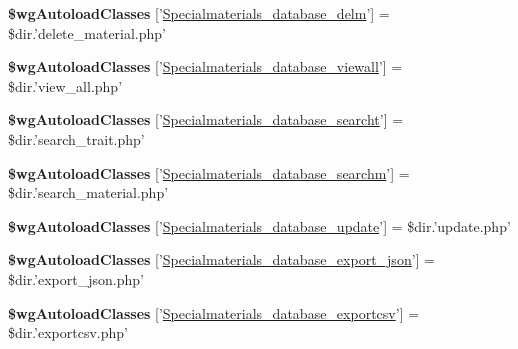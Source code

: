 \begin{DoxyCompactItemize}
\item 
\hypertarget{materials__database_8php_ac93b9b1094d6e1fb15174d3e89d96e6a}{{\bfseries \$wg\+Autoload\+Classes} \mbox{[}'\hyperlink{classSpecialmaterials__database__delm}{Specialmaterials\+\_\+database\+\_\+delm}'\mbox{]} = \$dir.'delete\+\_\+material.\+php'}\label{materials__database_8php_ac93b9b1094d6e1fb15174d3e89d96e6a}

\item 
\hypertarget{materials__database_8php_a0ecbe9942ec8f44a77a6bf29d7ab7921}{{\bfseries \$wg\+Autoload\+Classes} \mbox{[}'\hyperlink{classSpecialmaterials__database__viewall}{Specialmaterials\+\_\+database\+\_\+viewall}'\mbox{]} = \$dir.'view\+\_\+all.\+php'}\label{materials__database_8php_a0ecbe9942ec8f44a77a6bf29d7ab7921}

\item 
\hypertarget{materials__database_8php_a779a016fba9732d575cf74a60dbb6aae}{{\bfseries \$wg\+Autoload\+Classes} \mbox{[}'\hyperlink{classSpecialmaterials__database__searcht}{Specialmaterials\+\_\+database\+\_\+searcht}'\mbox{]} = \$dir.'search\+\_\+trait.\+php'}\label{materials__database_8php_a779a016fba9732d575cf74a60dbb6aae}

\item 
\hypertarget{materials__database_8php_ae309068148e08465231bdc41ec126ca8}{{\bfseries \$wg\+Autoload\+Classes} \mbox{[}'\hyperlink{classSpecialmaterials__database__searchm}{Specialmaterials\+\_\+database\+\_\+searchm}'\mbox{]} = \$dir.'search\+\_\+material.\+php'}\label{materials__database_8php_ae309068148e08465231bdc41ec126ca8}

\item 
\hypertarget{materials__database_8php_a3390934ea85b61c5c70831277c78f023}{{\bfseries \$wg\+Autoload\+Classes} \mbox{[}'\hyperlink{classSpecialmaterials__database__update}{Specialmaterials\+\_\+database\+\_\+update}'\mbox{]} = \$dir.'update.\+php'}\label{materials__database_8php_a3390934ea85b61c5c70831277c78f023}

\item 
\hypertarget{materials__database_8php_a18fbb089eccaae3d2296af3539db4c5a}{{\bfseries \$wg\+Autoload\+Classes} \mbox{[}'\hyperlink{classSpecialmaterials__database__export__json}{Specialmaterials\+\_\+database\+\_\+export\+\_\+json}'\mbox{]} = \$dir.'export\+\_\+json.\+php'}\label{materials__database_8php_a18fbb089eccaae3d2296af3539db4c5a}

\item 
\hypertarget{materials__database_8php_aff0a0f85cae68dd28f67c87dfd8c48ab}{{\bfseries \$wg\+Autoload\+Classes} \mbox{[}'\hyperlink{classSpecialmaterials__database__exportcsv}{Specialmaterials\+\_\+database\+\_\+exportcsv}'\mbox{]} = \$dir.'exportcsv.\+php'}\label{materials__database_8php_aff0a0f85cae68dd28f67c87dfd8c48ab}


\end{DoxyCompactItemize}
